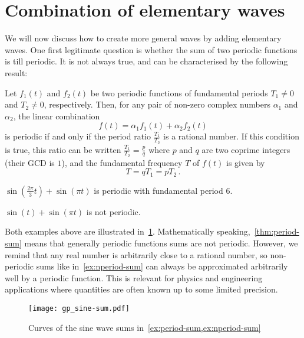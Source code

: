 \section{Combination of elementary waves}
We will now discuss how to create more general waves by adding elementary waves. One first
legitimate question is whether the sum of two periodic functions is till periodic. It is
not always true, and can be characterised by the following result:
\begin{theorem}
  \label{thm:period-sum}
  Let $f_1(t)$ and $f_2(t)$ be two periodic functions of fundamental periods $T_1\neq 0$ and
  $T_2\neq 0$, respectively. Then, for any pair of non-zero complex numbers $\alpha_1$ and $\alpha_2$, the linear combination
  \begin{equation}
    f(t)=\alpha_1 f_1(t)+\alpha_2 f_2(t)
  \end{equation}
  is periodic if and only if the period ratio  $\frac{T_1}{T_2}$ is
  a rational number. If this condition is true, this ratio can be written
  $\frac{T_1}{T_2}=\frac{p}{q}$ where $p$ and $q$ are two coprime integers (\ie their GCD
  is $1$), and the fundamental frequency $T$ of $f(t)$ is given by
  \begin{equation}
    T=qT_1=pT_2\,.
  \end{equation}
\end{theorem}
\begin{example}
  \label{ex:period-sum}
  $\sin\left(\frac{2\pi}{3}t\right)+\sin(\pi t)$ is periodic with fundamental period $6$.
\end{example}
\begin{example}
  \label{ex:nperiod-sum}
  $\sin(t)+\sin(\pi t)$ is not periodic.
\end{example}
\noindent Both examples above are illustrated in~\cref{fig:sine-sum}. Mathematically
speaking,~\cref{thm:period-sum} means that generally periodic functions sums are not
periodic. However, we remind that any real number is arbitrarily close to a rational
number, so non-periodic sums like in~\cref{ex:nperiod-sum} can always be approximated
arbitrarily well by a periodic function. This is relevant for physics and engineering
applications where quantities are often known up to some limited precision.
\begin{figure}[t]
  \centering
  \texttt{[image: gp\_sine-sum.pdf]}
  \caption{Curves of the sine wave sums in~\cref{ex:period-sum,ex:nperiod-sum}}
  \label{fig:sine-sum}
\end{figure}

